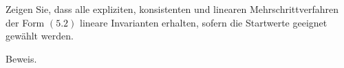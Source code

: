 \begin{exercise}
  Zeigen Sie, dass alle expliziten, konsistenten und linearen
  Mehrschrittverfahren der Form $(5.2)$ lineare Invarianten
  erhalten, sofern die Startwerte geeignet gewählt werden.
\end{exercise}

\begin{solution}
  Beweis.
\end{solution}
